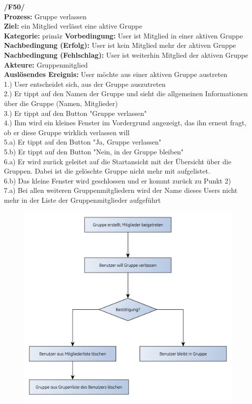 \textbf{/F50/}\\
\textbf{Prozess:} Gruppe verlassen\\
\textbf{Ziel:} ein Mitglied verlässt eine aktive Gruppe\\
\textbf{Kategorie:} primär
\textbf{Vorbedingung:} User ist Mitglied in einer aktiven Gruppe
\textbf{Nachbedingung (Erfolg):} User ist kein Mitglied mehr der aktiven Gruppe\\
\textbf{Nachbedingung (Fehlschlag):} User ist weiterhin Mitglied der aktiven Gruppe\\
\textbf{Akteure:} Gruppenmitglied\\
\textbf{Auslösendes Ereignis:} User möchte aus einer aktiven Gruppe austreten\\
1.) User entscheidet sich, aus der Gruppe auszutreten\\
2.) Er tippt auf den Namen der Gruppe und sieht die allgemeinen Informationen über die Gruppe (Namen, Mitglieder)\\
3.) Er tippt auf den Button "Gruppe verlassen"\\
4.) Ihm wird ein kleines Fenster im Vordergrund angezeigt, das ihn erneut fragt, ob er diese Gruppe wirklich verlassen will\\
5.a) Er tippt auf den Button "Ja, Gruppe verlassen"\\
5.b) Er tippt auf den Button "Nein, in der Gruppe bleiben"\\
6.a) Er wird zurück geleitet auf die Startansicht mit der Übersicht über die Gruppen. Dabei ist die gelöschte Gruppe nicht mehr mit aufgelistet.\\
6.b) Das kleine Fenster wird geschlossen und er kommt zurück zu Punkt 2)\\
7.a) Bei allen weiteren Gruppenmitgliedern wird der Name dieses Users nicht mehr in der Liste der Gruppenmitglieder aufgeführt\\

\begin{figure} [H]
	\centering
	\includegraphics[scale=0.7]{./res/F50_gruppe_verlassen_flowgraph.pdf}
\end{figure}

